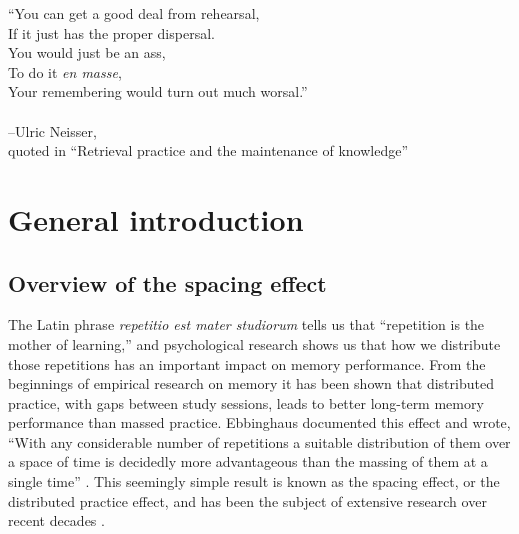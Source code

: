 
\begin{center}

\vspace{5cm}

``You can get a good deal from rehearsal,\\
If it just has the proper dispersal.\\
You would just be an ass,\\
To do it \textit{en masse},\\
Your remembering would turn out much worsal.''\\
~\\
--Ulric Neisser,\\
{\small quoted in ``Retrieval practice and the maintenance of knowledge'' \cite{Bjor1988}}
\end{center}

\newpage

\chapter{General introduction}


\section{Overview of the spacing effect}


The Latin phrase \textit{repetitio est mater studiorum} tells us that ``repetition is the mother of learning,'' and psychological research shows us that how we distribute those repetitions has an important impact on memory performance.  From the beginnings of empirical research on memory it has been shown that distributed practice, with gaps between study sessions, leads to better long-term memory performance than massed practice.  Ebbinghaus documented this effect and wrote, ``With any considerable number of repetitions a suitable distribution of them over a space of time is decidedly more advantageous than the massing of them at a single time'' \cite[p.~89]{Ebbi1885}.  This seemingly simple result is known as the spacing effect, or the distributed practice effect, and has been the subject of extensive research over recent decades \cite<for reviews, see>{CepeEtal2006,CepeEtal2009,DelaEtal2010}.

